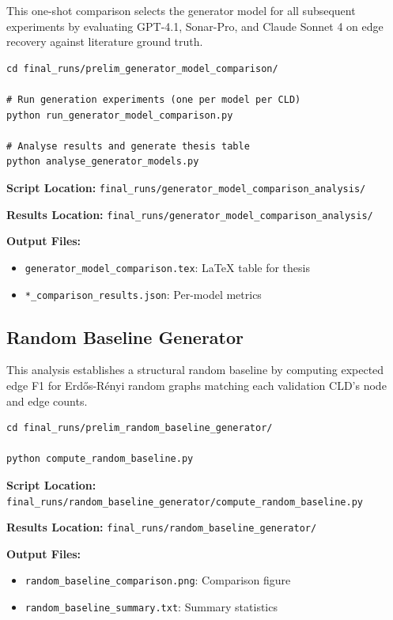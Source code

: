 This one-shot comparison selects the generator model for all subsequent experiments by evaluating GPT-4.1, Sonar-Pro, and Claude Sonnet 4 on edge recovery against literature ground truth.

\begin{verbatim}
cd final_runs/prelim_generator_model_comparison/

# Run generation experiments (one per model per CLD)
python run_generator_model_comparison.py

# Analyse results and generate thesis table
python analyse_generator_models.py
\end{verbatim}

\textbf{Script Location:} \texttt{final\_runs/generator\_model\_comparison\_analysis/}

\textbf{Results Location:} \texttt{final\_runs/generator\_model\_comparison\_analysis/}

\textbf{Output Files:}
\begin{itemize}[noitemsep]
    \item \texttt{generator\_model\_comparison.tex}: LaTeX table for thesis
    \item \texttt{*\_comparison\_results.json}: Per-model metrics
\end{itemize}

\subsection{Random Baseline Generator}
\label{sec:random_baseline}

This analysis establishes a structural random baseline by computing expected edge F1 for Erd\H{o}s-R\'enyi random graphs matching each validation CLD's node and edge counts.

\begin{verbatim}
cd final_runs/prelim_random_baseline_generator/

python compute_random_baseline.py
\end{verbatim}

\textbf{Script Location:} \texttt{final\_runs/random\_baseline\_generator/compute\_random\_baseline.py}

\textbf{Results Location:} \texttt{final\_runs/random\_baseline\_generator/}

\textbf{Output Files:}
\begin{itemize}[noitemsep]
    \item \texttt{random\_baseline\_comparison.png}: Comparison figure
    \item \texttt{random\_baseline\_summary.txt}: Summary statistics
\end{itemize}

